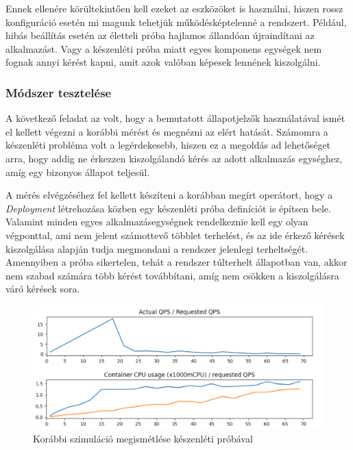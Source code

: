 Ennek ellenére körültekintően kell ezeket az eszközöket is használni, hiszen rossz konfiguráció esetén mi magunk tehetjük működésképtelenné a rendszert.
Például, hibás beállítás esetén az életteli próba hajlamos állandóan újraindítani az alkalmazást. Vagy a készenléti próba miatt egyes komponens egységek nem fognak annyi kérést kapni, amit azok valóban képesek lennének kiszolgálni.

\subsubsection{Módszer tesztelése}
A következő feladat az volt, hogy a bemutatott állapotjelzők használatával ismét el kellett végezni a korábbi mérést és megnézni az elért hatását.
Számomra a készenléti probléma volt a legérdekesebb, hiszen ez a megoldás ad lehetőséget arra, hogy addig ne érkezzen kiszolgálandó kérés az adott alkalmazás egységhez, amíg egy bizonyos állapot teljesül.

A mérés elvégzéséhez fel kellett készíteni a korábban megírt operátort, hogy a \textit{Deployment} létrehozása közben egy készenléti próba definíciót is építsen bele. 
Valamint minden egyes alkalmazásegységnek rendelkeznie kell egy olyan végponttal, ami nem jelent számottevő többlet terhelést, és az ide érkező kérések kiszolgálása alapján tudja megmondani a rendszer jelenlegi terheltségét. 
Amennyiben a próba sikertelen, tehát a rendszer túlterhelt állapotban van, akkor nem szabad számára több kérést továbbítani, amíg nem csökken a kiszolgálásra váró kérések sora.

\begin{figure}[!ht]
\centering
\includegraphics[width=150mm, keepaspectratio]{figures/multiFE-singleBE-readinessprobe-sum.png}
\caption{Korábbi szimuláció megismétlése készenléti próbával}
\label{fig:readiness-probe-measurement}
\end{figure}

